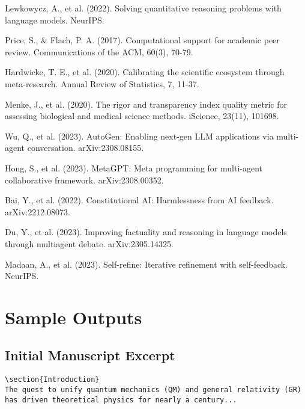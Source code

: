 \documentclass[11pt,a4paper]{article}
\begin{document}
\begin{thebibliography}{99}
 Lewkowycz, A., et al. (2022). Solving quantitative reasoning problems with language models. NeurIPS.

 Price, S., \& Flach, P. A. (2017). Computational support for academic peer review. Communications of the ACM, 60(3), 70-79.

 Hardwicke, T. E., et al. (2020). Calibrating the scientific ecosystem through meta-research. Annual Review of Statistics, 7, 11-37.

 Menke, J., et al. (2020). The rigor and transparency index quality metric for assessing biological and medical science methods. iScience, 23(11), 101698.

 Wu, Q., et al. (2023). AutoGen: Enabling next-gen LLM applications via multi-agent conversation. arXiv:2308.08155.

 Hong, S., et al. (2023). MetaGPT: Meta programming for multi-agent collaborative framework. arXiv:2308.00352.

 Bai, Y., et al. (2022). Constitutional AI: Harmlessness from AI feedback. arXiv:2212.08073.

 Du, Y., et al. (2023). Improving factuality and reasoning in language models through multiagent debate. arXiv:2305.14325.

 Madaan, A., et al. (2023). Self-refine: Iterative refinement with self-feedback. NeurIPS.

\end{thebibliography}

\appendix

\section{Sample Outputs}

\subsection{Initial Manuscript Excerpt}

\begin{verbatim}
\section{Introduction}
The quest to unify quantum mechanics (QM) and general relativity (GR) 
has driven theoretical physics for nearly a century...
\end{verbatim}
\end{document}
